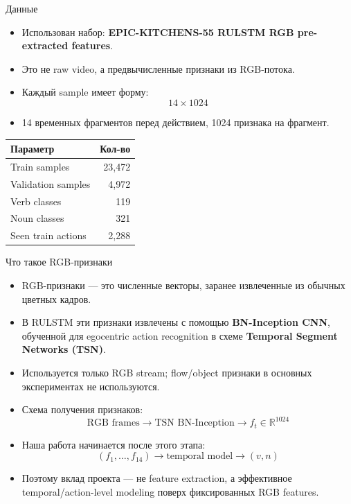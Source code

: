\documentclass[aspectratio=169,10pt]{beamer}
\begin{document}
\begin{frame}{Данные}
    \begin{itemize}
        \item Использован набор: \textbf{EPIC-KITCHENS-55 RULSTM RGB pre-extracted features}.
        \item Это не raw video, а предвычисленные признаки из RGB-потока.
        \item Каждый sample имеет форму:
        \[
            14 \times 1024
        \]
        \item 14 временных фрагментов перед действием, 1024 признака на фрагмент.
    \end{itemize}

    \vspace{0.25cm}
    \begin{table}
        \centering
        \begin{tabular}{lr}
            \toprule
            Параметр & Кол-во \\
            \midrule
            Train samples & 23,472 \\
            Validation samples & 4,972 \\
            Verb classes & 119 \\
            Noun classes & 321 \\
            Seen train actions & 2,288 \\
            \bottomrule
        \end{tabular}
    \end{table}
\end{frame}

\begin{frame}{Что такое RGB-признаки}
    \begin{itemize}
        \item RGB-признаки --- это численные векторы, заранее извлеченные из обычных цветных кадров.
        \item В RULSTM эти признаки извлечены с помощью \textbf{BN-Inception CNN}, обученной для egocentric action recognition в схеме \textbf{Temporal Segment Networks (TSN)}.
        \item Используется только RGB stream; flow/object признаки в основных экспериментах не используются.
        \item Схема получения признаков:
        \[
            \text{RGB frames} \rightarrow \text{TSN BN-Inception} \rightarrow f_t \in \mathbb{R}^{1024}
        \]
        \item Наша работа начинается после этого этапа:
        \[
            (f_1,\ldots,f_{14}) \rightarrow \text{temporal model} \rightarrow (v,n)
        \]
        \item Поэтому вклад проекта --- не feature extraction, а эффективное temporal/action-level modeling поверх фиксированных RGB features.
    \end{itemize}
\end{frame}
\end{document}

